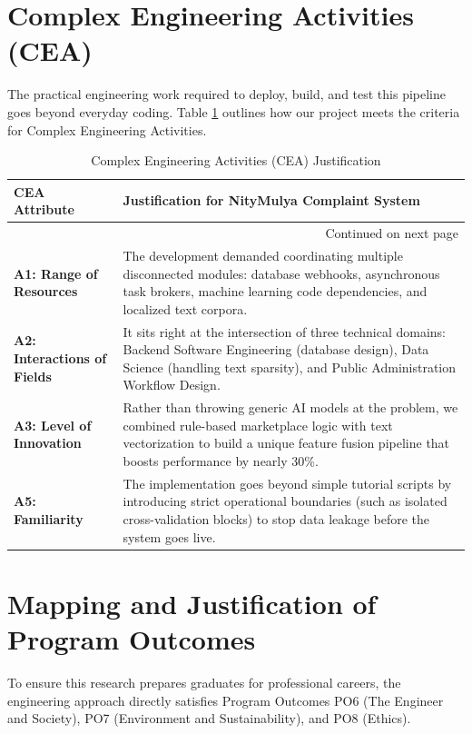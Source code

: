 \documentclass[12pt,a4paper,openany]{book}
\begin{document}
\section{Complex Engineering Activities (CEA)}
The practical engineering work required to deploy, build, and test this pipeline goes beyond everyday coding. Table \ref{tab:cea_justification} outlines how our project meets the criteria for Complex Engineering Activities.

\begin{longtable}{p{} p{}}
\caption{Complex Engineering Activities (CEA) Justification} \label{tab:cea_justification} \\
\toprule
\textbf{CEA Attribute} & \textbf{Justification for NityMulya Complaint System} \\
\midrule
\endhead
\bottomrule
\multicolumn{2}{r}{Continued on next page} \\
\endfoot
\bottomrule
\endlastfoot
\textbf{A1: Range of Resources} & The development demanded coordinating multiple disconnected modules: database webhooks, asynchronous task brokers, machine learning code dependencies, and localized text corpora. \\
\addlinespace
\textbf{A2: Interactions of Fields} & It sits right at the intersection of three technical domains: Backend Software Engineering (database design), Data Science (handling text sparsity), and Public Administration Workflow Design. \\
\addlinespace
\textbf{A3: Level of Innovation} & Rather than throwing generic AI models at the problem, we combined rule-based marketplace logic with text vectorization to build a unique feature fusion pipeline that boosts performance by nearly 30\%. \\
\addlinespace
\textbf{A5: Familiarity} & The implementation goes beyond simple tutorial scripts by introducing strict operational boundaries (such as isolated cross-validation blocks) to stop data leakage before the system goes live. \\
\end{longtable}

\section{Mapping and Justification of Program Outcomes}
To ensure this research prepares graduates for professional careers, the engineering approach directly satisfies Program Outcomes PO6 (The Engineer and Society), PO7 (Environment and Sustainability), and PO8 (Ethics).
\end{document}
